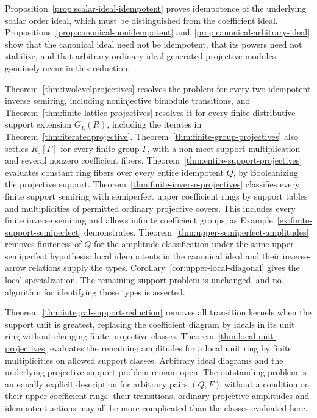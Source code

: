 \documentclass[11pt]{amsart}
\theoremstyle{definition}
\theoremstyle{remark}
\begin{document}
Proposition~\ref{prop:scalar-ideal-idempotent} proves idempotence of the underlying scalar order ideal, which must be distinguished from the coefficient ideal. Propositions~\ref{prop:canonical-nonidempotent} and~\ref{prop:canonical-arbitrary-ideal} show that the canonical ideal need not be idempotent, that its powers need not stabilize, and that arbitrary ordinary ideal-generated projective modules genuinely occur in this reduction.

Theorem~\ref{thm:twolevelprojectives} resolves the problem for every two-idempotent inverse semiring, including noninjective bimodule transitions, and Theorem~\ref{thm:finite-lattice-projectives} resolves it for every finite distributive support extension $G_L(R)$, including the iterates in Theorem~\ref{thm:iteratedprojective}. Theorem~\ref{thm:finite-group-projectives} also settles $R_0[\Gamma]$ for every finite group $\Gamma$, with a non-meet support multiplication and several nonzero coefficient fibers. Theorem~\ref{thm:entire-support-projectives} evaluates constant ring fibers over every entire idempotent $Q$, by Booleanizing the projective support. Theorem~\ref{thm:finite-inverse-projectives} classifies every finite support semiring with semiperfect upper coefficient rings by support tables and multiplicities of permitted ordinary projective covers. This includes every finite inverse semiring and allows infinite coefficient groups, as Example~\ref{ex:finite-support-semiperfect} demonstrates. Theorem~\ref{thm:upper-semiperfect-amplitudes} removes finiteness of $Q$ for the amplitude classification under the same upper-semiperfect hypothesis: local idempotents in the canonical ideal and their inverse-arrow relations supply the types. Corollary~\ref{cor:upper-local-diagonal} gives the local specialization. The remaining support problem is unchanged, and no algorithm for identifying those types is asserted.

Theorem~\ref{thm:integral-support-reduction} removes all transition kernels when the support unit is greatest, replacing the coefficient diagram by ideals in its unit ring without changing finite-projective classes. Theorem~\ref{thm:local-unit-projectives} evaluates the remaining amplitudes for a local unit ring by finite multiplicities on allowed support classes. Arbitrary ideal diagrams and the underlying projective support problem remain open. The outstanding problem is an equally explicit description for arbitrary pairs $(Q,F)$ without a condition on their upper coefficient rings: their transitions, ordinary projective amplitudes and idempotent actions may all be more complicated than the classes evaluated here.
\end{document}
